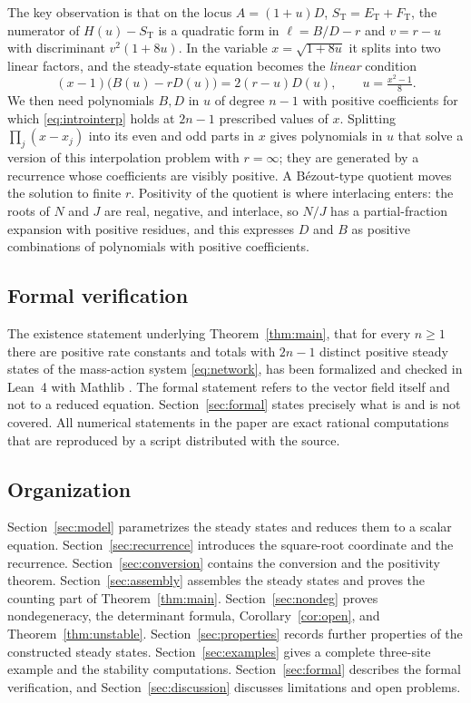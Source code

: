 \documentclass[11pt]{article}
\theoremstyle{plain}
\theoremstyle{definition}
\theoremstyle{remark}
\numberwithin{equation}{section}
\newcommand{\ET}{E_{\mathrm T}}
\newcommand{\FT}{F_{\mathrm T}}
\newcommand{\ST}{S_{\mathrm T}}
\begin{document}
The key observation is that on the locus \(A=(1+u)D\), \(\ST=\ET+\FT\), the numerator of
\(H(u)-\ST\) is a quadratic form in \(\ell=B/D-r\) and \(v=r-u\) with discriminant
\(v^2(1+8u)\). In the variable \(x=\sqrt{1+8u}\) it splits into two linear factors, and the
steady-state equation becomes the \emph{linear} condition
\begin{equation}\label{eq:introinterp}
 (x-1)\bigl(B(u)-rD(u)\bigr)=2(r-u)D(u),\qquad u=\tfrac{x^2-1}{8}.
\end{equation}
We then need polynomials \(B,D\) in \(u\) of degree \(n-1\) with positive coefficients for
which \eqref{eq:introinterp} holds at \(2n-1\) prescribed values of \(x\). Splitting
\(\prod_j(x-x_j)\) into its even and odd parts in \(x\) gives polynomials in \(u\) that solve a
version of this interpolation problem with \(r=\infty\); they are generated by a recurrence
whose coefficients are visibly positive. A B\'ezout-type quotient moves the solution to finite
\(r\). Positivity of the quotient is where interlacing enters: the roots of \(N\) and \(J\)
are real, negative, and interlace, so \(N/J\) has a partial-fraction expansion with positive
residues, and this expresses \(D\) and \(B\) as positive combinations of polynomials with
positive coefficients.

\subsection{Formal verification}
The existence statement underlying Theorem~\ref{thm:main}, that for every \(n\ge1\) there are
positive rate constants and totals with \(2n-1\) distinct positive steady states of the
mass-action system \eqref{eq:network}, has been formalized and checked in Lean~4
\cite{Lean4} with Mathlib \cite{Mathlib}. The formal statement refers to the vector field
itself and not to a reduced equation. Section~\ref{sec:formal} states precisely what is and is
not covered. All numerical statements in the paper are exact rational computations that are
reproduced by a script distributed with the source.

\subsection{Organization}
Section~\ref{sec:model} parametrizes the steady states and reduces them to a scalar equation.
Section~\ref{sec:recurrence} introduces the square-root coordinate and the recurrence.
Section~\ref{sec:conversion} contains the conversion and the positivity theorem.
Section~\ref{sec:assembly} assembles the steady states and proves the counting part of
Theorem~\ref{thm:main}. Section~\ref{sec:nondeg} proves nondegeneracy, the determinant formula,
Corollary~\ref{cor:open}, and Theorem~\ref{thm:unstable}. Section~\ref{sec:properties} records
further properties of the constructed steady states. Section~\ref{sec:examples} gives a
complete three-site example and the stability computations.
Section~\ref{sec:formal} describes the formal verification, and
Section~\ref{sec:discussion} discusses limitations and open problems.
\end{document}
